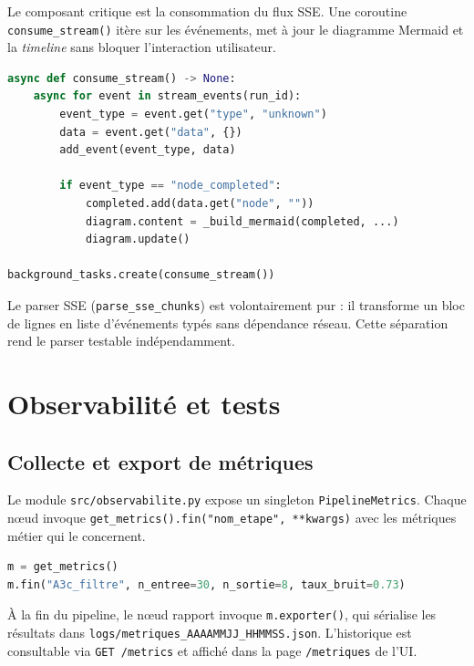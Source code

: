 Le composant critique est la consommation du flux SSE. Une coroutine \texttt{consume\_stream()} itère sur les événements, met à jour le diagramme Mermaid et la \textit{timeline} sans bloquer l'interaction utilisateur.

\begin{lstlisting}[language=Python,caption={Consommation SSE asynchrone côté UI (\texttt{src/ui/app.py})}]
async def consume_stream() -> None:
    async for event in stream_events(run_id):
        event_type = event.get("type", "unknown")
        data = event.get("data", {})
        add_event(event_type, data)

        if event_type == "node_completed":
            completed.add(data.get("node", ""))
            diagram.content = _build_mermaid(completed, ...)
            diagram.update()

background_tasks.create(consume_stream())
\end{lstlisting}

Le parser SSE (\texttt{parse\_sse\_chunks}) est volontairement pur : il transforme un bloc de lignes en liste d'événements typés sans dépendance réseau. Cette séparation rend le parser testable indépendamment.

\section{Observabilité et tests}
\label{sec:observ}

\subsection{Collecte et export de métriques}

Le module \texttt{src/observabilite.py} expose un singleton \texttt{PipelineMetrics}. Chaque nœud invoque \texttt{get\_metrics().fin("nom\_etape", **kwargs)} avec les métriques métier qui le concernent.

\begin{lstlisting}[language=Python,caption={Annotation d'une étape avec ses métriques métier}]
m = get_metrics()
m.fin("A3c_filtre", n_entree=30, n_sortie=8, taux_bruit=0.73)
\end{lstlisting}

À la fin du pipeline, le nœud rapport invoque \texttt{m.exporter()}, qui sérialise les résultats dans \texttt{logs/metriques\_AAAAMMJJ\_HHMMSS.json}. L'historique est consultable via \texttt{GET /metrics} et affiché dans la page \texttt{/metriques} de l'UI.


